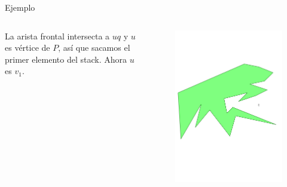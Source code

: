 \documentclass[aspectratio=169,xcolor=dvipsnames, t]{beamer}
\begin{document}
\begin{frame}{Ejemplo}
  \begin{columns}
    \begin{column}{0.3\textwidth}
      \raggedright %
      La arista frontal intersecta a $uq$ y $u$ es vértice de $P$, así que sacamos el primer elemento del stack. Ahora $u$ es $v_{1}$.
    \end{column}
    \begin{column}{0.7\textwidth}
      \vspace{-2.5cm} %
      \begin{figure}
        \centering
        \includegraphics[width=1\linewidth, height=.95\textheight, page=14, keepaspectratio]{IPE/point_visibility.pdf}
      \end{figure}
    \end{column}
  \end{columns}
\end{frame}
\end{document}
